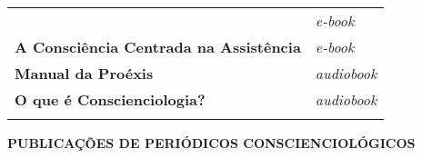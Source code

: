 \documentclass[
]{article}
\begin{document}
\begin{longtable}[]{@{}
  >{\raggedright\arraybackslash}p{}
  >{\raggedright\arraybackslash}p{}@{}}
\begin{minipage}[b]{\linewidth}
\end{minipage} & \begin{minipage}[b]{\linewidth}\raggedright
\emph{e-book}
\end{minipage} \\
\begin{minipage}[b]{\linewidth}\raggedright
\textbf{A Consciência Centrada na Assistência}
\end{minipage} & \begin{minipage}[b]{\linewidth}\raggedright
\emph{e-book}
\end{minipage} \\
\begin{minipage}[b]{\linewidth}\raggedright
\textbf{Manual da Proéxis}
\end{minipage} & \begin{minipage}[b]{\linewidth}\raggedright
\emph{audiobook}
\end{minipage} \\
\begin{minipage}[b]{\linewidth}\raggedright
\textbf{O que é Conscienciologia?}
\end{minipage} & \begin{minipage}[b]{\linewidth}\raggedright
\emph{audiobook}
\end{minipage} \\
\midrule\noalign{}
\endhead
\bottomrule\noalign{}
\endlastfoot
\end{longtable}

\textbf{PUBLICAÇÕES DE PERIÓDICOS CONSCIENCIOLÓGICOS}
\end{document}
